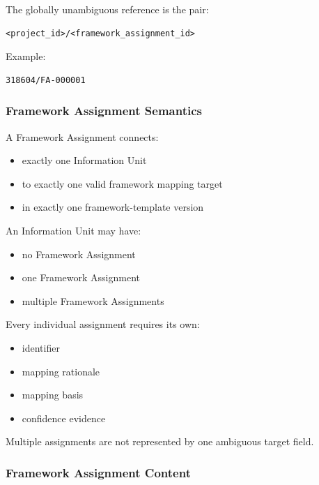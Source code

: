 The globally unambiguous reference is the pair:

\begin{verbatim}
<project_id>/<framework_assignment_id>
\end{verbatim}

Example:

\begin{verbatim}
318604/FA-000001
\end{verbatim}

\hypertarget{framework-assignment-semantics}{%
\subsubsection{Framework Assignment Semantics}\label{framework-assignment-semantics}}

A Framework Assignment connects:

\begin{itemize}
\tightlist
\item
  exactly one Information Unit
\item
  to exactly one valid framework mapping target
\item
  in exactly one framework-template version
\end{itemize}

An Information Unit may have:

\begin{itemize}
\tightlist
\item
  no Framework Assignment
\item
  one Framework Assignment
\item
  multiple Framework Assignments
\end{itemize}

Every individual assignment requires its own:

\begin{itemize}
\tightlist
\item
  identifier
\item
  mapping rationale
\item
  mapping basis
\item
  confidence evidence
\end{itemize}

Multiple assignments are not represented by one ambiguous target field.

\hypertarget{framework-assignment-content}{%
\subsubsection{Framework Assignment Content}\label{framework-assignment-content}}

